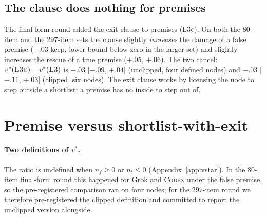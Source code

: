 \documentclass[11pt]{article}
\begin{document}
\subsection{The clause does nothing for premises}
The final-form round added the exit clause to premises (\textsc{L3c}). On both the 80-item and the 297-item sets the clause slightly \emph{increases} the damage of a false premise ($-.03$ keep, lower bound below zero in the larger set) and slightly increases the rescue of a true premise ($+.05$, $+.06$). The two cancel: $v^\ast(\textsc{L3c})-v^\ast(\textsc{L3})$ is $-.03$ [$-.09$, $+.04$] (unclipped, four defined nodes) and $-.03$ [$-.11$, $+.03$] (clipped, six nodes). The exit clause works by licensing the node to step outside a shortlist; a premise has no inside to step out of.

\section{Premise versus shortlist-with-exit}
\label{sec:head}

\paragraph{Two definitions of $v^\ast$.} The ratio is undefined when $n_f\ge0$ or $n_t\le0$ (Appendix~\ref{app:vstar}). In the 80-item final-form round this happened for Grok and \textsc{Codex} under the false premise, so the pre-registered comparison ran on four nodes; for the 297-item round we therefore pre-registered the clipped definition and committed to report the unclipped version alongside.
\end{document}
